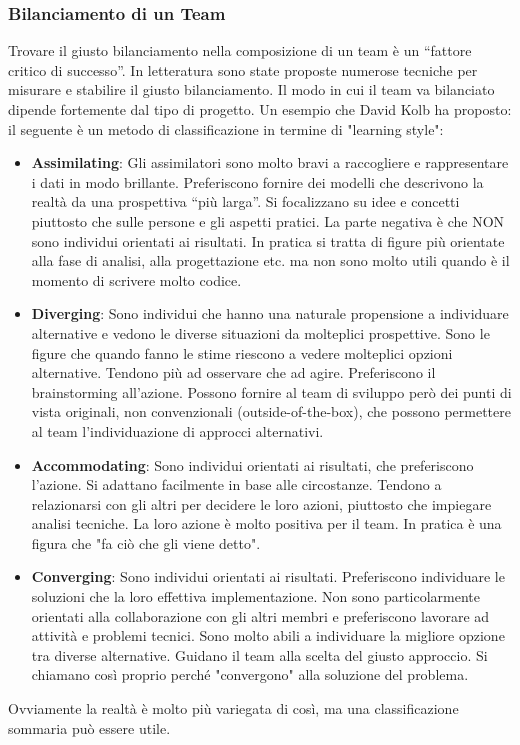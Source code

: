 \subsubsection{Bilanciamento di un Team}
Trovare il giusto bilanciamento nella composizione di un team è un “fattore critico di successo”.
In letteratura sono state proposte numerose tecniche per misurare e stabilire il giusto bilanciamento. Il modo in cui il team va bilanciato dipende fortemente dal tipo di progetto. Un esempio che David Kolb ha proposto: il seguente è un metodo di classificazione in termine di "learning style":
\begin{itemize}
	\item \textbf{Assimilating}: Gli assimilatori sono molto bravi a raccogliere e rappresentare i dati in modo brillante. Preferiscono fornire dei modelli che descrivono la realtà da una prospettiva “più larga”. Si focalizzano su idee e concetti piuttosto che sulle persone e gli aspetti pratici. La parte negativa è che NON sono individui orientati ai risultati. In pratica si tratta di figure più orientate alla fase di analisi, alla progettazione etc. ma non sono molto utili quando è il momento di scrivere molto codice.
	\item \textbf{Diverging}: Sono individui che hanno una naturale propensione a individuare alternative e vedono le diverse situazioni da molteplici prospettive. Sono le figure che quando fanno le stime riescono a vedere molteplici opzioni alternative. Tendono più ad osservare che ad agire. Preferiscono il brainstorming all’azione. Possono fornire al team di sviluppo però dei punti di vista originali, non convenzionali (outside-of-the-box), che possono permettere al team l’individuazione di approcci alternativi.
	\item \textbf{Accommodating}: Sono individui orientati ai risultati, che preferiscono l’azione. Si adattano facilmente in base alle circostanze. Tendono a relazionarsi con gli altri per decidere le loro azioni, piuttosto che impiegare analisi tecniche. La loro azione è molto positiva per il team. In pratica è una figura che "fa ciò che gli viene detto".
	\item \textbf{Converging}: Sono individui orientati ai risultati. Preferiscono individuare le soluzioni che la loro effettiva implementazione. Non sono particolarmente orientati alla collaborazione con gli altri membri e preferiscono lavorare ad attività e problemi tecnici. Sono molto abili a individuare la migliore opzione tra diverse alternative. Guidano il team alla scelta del giusto approccio. Si chiamano così proprio perché "convergono" alla soluzione del problema.
\end{itemize}
Ovviamente la realtà è molto più variegata di così, ma una classificazione sommaria può essere utile.

